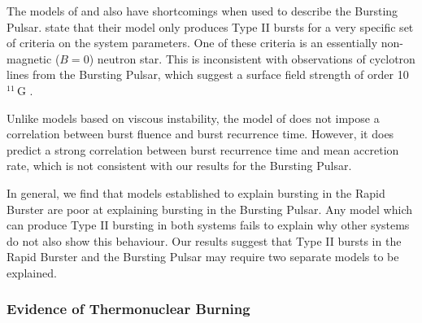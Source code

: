 \par The models of \citet{Spruit_Type2Mod} and \citet{Walker_Type2Mod} also have shortcomings when used to describe the Bursting Pulsar.  \citet{Walker_Type2Mod} state that their model only produces Type II bursts for a very specific set of criteria on the system parameters.   One of these criteria is an essentially non-magnetic ($B=0$) neutron star.  This is inconsistent with observations of cyclotron lines from the Bursting Pulsar, which suggest a surface field strength of order 10$^{11}$\,G \citep{Doroshenko_NBFlash}.
\par Unlike models based on viscous instability, the model of \citet{Spruit_Type2Mod} does not impose a correlation between burst fluence and burst recurrence time.  However, it does predict a strong correlation between burst recurrence time and mean accretion rate, which is not consistent with our results for the Bursting Pulsar.
\par In general, we find that models established to explain bursting in the Rapid Burster are poor at explaining bursting in the Bursting Pulsar.  Any model which can produce Type II bursting in both systems fails to explain why other systems do not also show this behaviour.  Our results suggest that Type II bursts in the Rapid Burster and the Bursting Pulsar may require two separate models to be explained.

\subsubsection{Evidence of Thermonuclear Burning}

